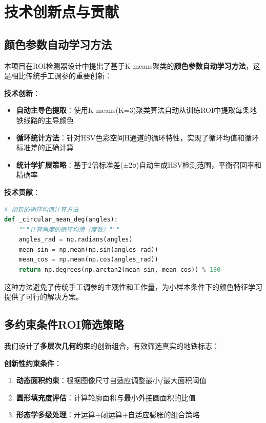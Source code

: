 \documentclass[12pt,a4paper]{article}
\begin{document}
\section{技术创新点与贡献}

\subsection{颜色参数自动学习方法}

本项目在ROI检测器设计中提出了基于K-means聚类的\textbf{颜色参数自动学习方法}，这是相比传统手工调参的重要创新：

\textbf{技术创新}：
\begin{itemize}
    \item \textbf{自动主导色提取}：使用K-means(K=3)聚类算法自动从训练ROI中提取每条地铁线路的主导颜色
    \item \textbf{循环统计方法}：针对HSV色彩空间H通道的循环特性，实现了循环均值和循环标准差的正确计算
    \item \textbf{统计学扩展策略}：基于2倍标准差(±2σ)自动生成HSV检测范围，平衡召回率和精确率
\end{itemize}

\textbf{技术贡献}：
\begin{lstlisting}[language=Python]
# 创新的循环均值计算方法
def _circular_mean_deg(angles):
    """计算角度的循环均值（度数）"""
    angles_rad = np.radians(angles)
    mean_sin = np.mean(np.sin(angles_rad))
    mean_cos = np.mean(np.cos(angles_rad))
    return np.degrees(np.arctan2(mean_sin, mean_cos)) % 180
\end{lstlisting}

这种方法避免了传统手工调参的主观性和工作量，为小样本条件下的颜色特征学习提供了可行的解决方案。

\subsection{多约束条件ROI筛选策略}

我们设计了\textbf{多层次几何约束}的创新组合，有效筛选真实的地铁标志：

\textbf{创新性约束条件}：
\begin{enumerate}
    \item \textbf{动态面积约束}：根据图像尺寸自适应调整最小/最大面积阈值
    \item \textbf{圆形填充度评估}：计算轮廓面积与最小外接圆面积的比值
    \item \textbf{形态学多级处理}：开运算+闭运算+自适应膨胀的组合策略
\end{enumerate}
\end{document}
